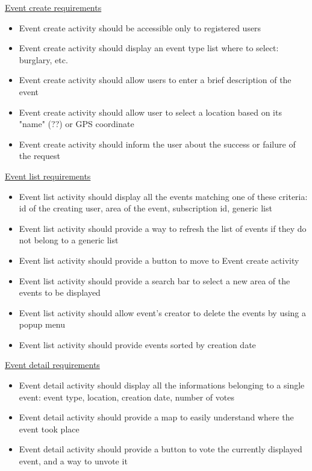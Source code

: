 \documentclass[a4paper]{scrreprt}
\begin{document}
\par \underline{Event create requirements}
\begin{itemize}
\item Event create activity should be accessible only to registered users
\item Event create activity should display an event type list where to select: burglary, etc.
\item Event create activity should allow users to enter a brief description of the event
\item Event create activity should allow user to select a location based on its "name" (??) or GPS coordinate
\item Event create activity should inform the user about the success or failure of the request
\end{itemize}

\par \underline{Event list requirements}
\begin{itemize}
\item Event list activity should display all the events matching one of these criteria: id of the creating user, area of the event, subscription id, generic list
\item Event list activity should provide a way to refresh the list of events if they do not belong to a generic list
\item Event list activity should provide a button to move to Event create activity
\item Event list activity should provide a search bar to select a new area of the events to be displayed
\item Event list activity should allow event's creator to delete the events by using a popup menu
\item Event list activity should provide events sorted by creation date
\end{itemize}

\par \underline{Event detail requirements}
\begin{itemize}
\item Event detail activity should display all the informations belonging to a single event: event type, location, creation date, number of votes
\item Event detail activity should provide a map to easily understand where the event took place
\item Event detail activity should provide a button to vote the currently displayed event, and a way to unvote it
\end{itemize}
\end{document}
